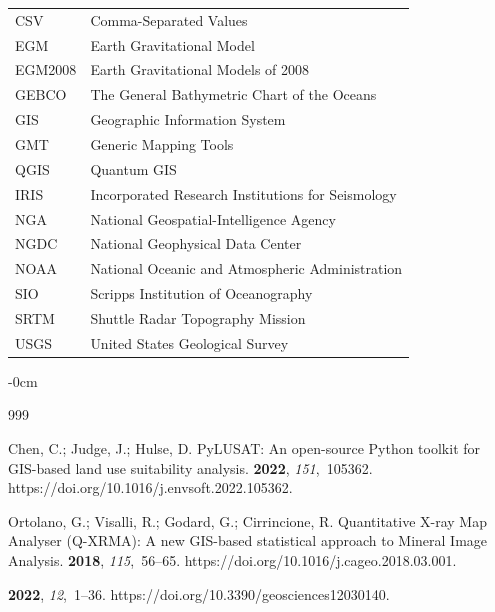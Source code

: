 \documentclass[data,article,accept,pdftex,moreauthors]{Definitions/mdpi}
\begin{document}
{{\noindent 
\begin{tabular}{@{}ll}
CSV & Comma-Separated Values %
 \\
EGM & Earth Gravitational Model \\ 
EGM2008 & Earth Gravitational Models of 2008\\
GEBCO & The General Bathymetric Chart of the Oceans \\
GIS & Geographic Information System \\
GMT & Generic Mapping Tools \\
QGIS & Quantum GIS \\
IRIS & Incorporated Research Institutions for Seismology \\
NGA & National Geospatial-Intelligence Agency \\
NGDC & National Geophysical Data Center \\
NOAA & National Oceanic and Atmospheric Administration \\
SIO & Scripps Institution of Oceanography \\
SRTM & Shuttle Radar Topography Mission \\
USGS & United States Geological Survey 
\end{tabular}}

\begin{adjustwidth}{-\extralength}{0cm}
\begin{thebibliography}{999}

Chen, C.; Judge, J.; Hulse, D.
\newblock PyLUSAT: An open-source Python toolkit for GIS-based land use
 suitability analysis.
 {\bf 2022}, {\em
 151},~105362.
https://doi.org/10.1016/j.envsoft.2022.105362.

Ortolano, G.; Visalli, R.; Godard, G.; Cirrincione, R.
\newblock Quantitative X-ray Map Analyser (Q-XRMA): A new GIS-based statistical
 approach to Mineral Image Analysis.
 {\bf 2018}, {\em 115},~56--65.
https://doi.org/10.1016/j.cageo.2018.03.001.

 {\bf 2022}, {\em 12},~1--36.
https://doi.org/10.3390/geosciences12030140.


\end{thebibliography}
\end{adjustwidth}}
\end{document}
